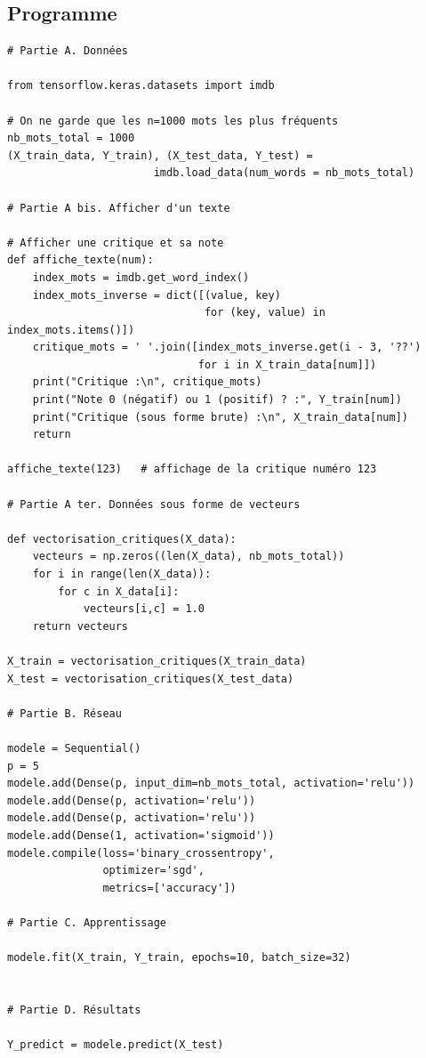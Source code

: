 \documentclass[11pt,class=report,crop=false]{standalone}
\begin{document}
\subsection{Programme}

\begin{lstlisting}
# Partie A. Données

from tensorflow.keras.datasets import imdb

# On ne garde que les n=1000 mots les plus fréquents
nb_mots_total = 1000     
(X_train_data, Y_train), (X_test_data, Y_test) = 
                       imdb.load_data(num_words = nb_mots_total)

# Partie A bis. Afficher d'un texte

# Afficher une critique et sa note 
def affiche_texte(num):
    index_mots = imdb.get_word_index()
    index_mots_inverse = dict([(value, key)
                               for (key, value) in index_mots.items()])
    critique_mots = ' '.join([index_mots_inverse.get(i - 3, '??')
                              for i in X_train_data[num]])
    print("Critique :\n", critique_mots)
    print("Note 0 (négatif) ou 1 (positif) ? :", Y_train[num])
    print("Critique (sous forme brute) :\n", X_train_data[num])
    return

affiche_texte(123)   # affichage de la critique numéro 123

# Partie A ter. Données sous forme de vecteurs

def vectorisation_critiques(X_data):
    vecteurs = np.zeros((len(X_data), nb_mots_total))
    for i in range(len(X_data)):
        for c in X_data[i]:
            vecteurs[i,c] = 1.0
    return vecteurs

X_train = vectorisation_critiques(X_train_data)
X_test = vectorisation_critiques(X_test_data)

# Partie B. Réseau 

modele = Sequential()
p = 5
modele.add(Dense(p, input_dim=nb_mots_total, activation='relu'))
modele.add(Dense(p, activation='relu'))
modele.add(Dense(p, activation='relu'))
modele.add(Dense(1, activation='sigmoid'))
modele.compile(loss='binary_crossentropy',
               optimizer='sgd',
               metrics=['accuracy'])

# Partie C. Apprentissage

modele.fit(X_train, Y_train, epochs=10, batch_size=32)


# Partie D. Résultats

Y_predict = modele.predict(X_test)
\end{lstlisting}
\end{document}

